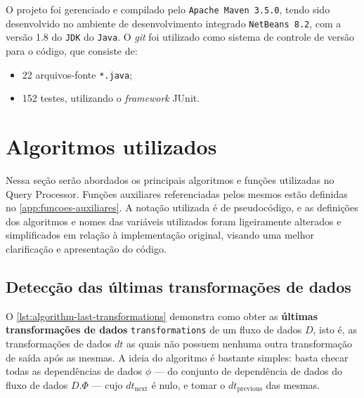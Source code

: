 O projeto foi gerenciado e compilado pelo \texttt{Apache Maven 3.5.0}, tendo sido desenvolvido no ambiente de desenvolvimento integrado \texttt{NetBeans 8.2}, com a versão 1.8 do \texttt{JDK} do \texttt{Java}. O \textit{git} foi utilizado como sistema de controle de versão para o código, que consiste de:

\begin{itemize}
\item 22 arquivos-fonte \texttt{*.java};
\item 152 testes, utilizando o \textit{framework} JUnit.
\end{itemize}


\section{Algoritmos utilizados}%
\label{sec:algoritmos-utilizados}

Nessa seção serão abordados os principais algoritmos e funções utilizadas no Query Processor. Funções auxiliares referenciadas pelos mesmos estão definidas no \autoref{app:funcoes-auxiliares}. A notação utilizada é de pseudocódigo, e as definições dos algoritmos e nomes das variáveis utilizados foram ligeiramente alterados e simplificados em relação à implementação original, visando uma melhor clarificação e apresentação do código.


\subsection{Detecção das últimas transformações de dados}

O \autoref{lst:algorithm-last-transformations} demonstra como obter as \textbf{últimas transformações de dados} \texttt{transformations} de um fluxo de dados \( D \), isto é, as transformações de dados \(dt\) as quais não possuem nenhuma outra transformação de saída após as mesmas. A ideia do algoritmo é bastante simples: basta checar todas as dependências de dados \( \phi \) --- do conjunto de dependência de dados do fluxo de dados \( D.\Phi \) --- cujo \( dt_{\textrm{next}} \) é nulo, e tomar o \( dt_{\textrm{previous}} \) das mesmas.

